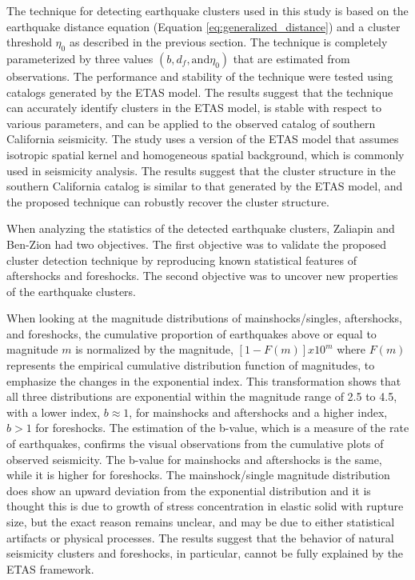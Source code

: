 \documentclass[12pt]{article} %
\theoremstyle{plain}
\begin{document}
	The technique for detecting earthquake clusters used in this study is based on the earthquake distance equation (Equation \ref{eq:generalized_distance}) and a cluster threshold $\eta_0$ as described in the previous section. The technique is completely parameterized by three values $(b, d_f, \text{and} \eta_0)$ that are estimated from observations. The performance and stability of the technique were tested using catalogs generated by the ETAS model. The results suggest that the technique can accurately identify clusters in the ETAS model, is stable with respect to various parameters, and can be applied to the observed catalog of southern California seismicity. The study uses a version of the ETAS model that assumes isotropic spatial kernel and homogeneous spatial background, which is commonly used in seismicity analysis. The results suggest that the cluster structure in the southern California catalog is similar to that generated by the ETAS model, and the proposed technique can robustly recover the cluster structure.
	
	When analyzing the statistics of the detected earthquake clusters, Zaliapin and Ben-Zion had two objectives. The first objective was to validate the proposed cluster detection technique by reproducing known statistical features of aftershocks and foreshocks. The second objective was to uncover new properties of the earthquake clusters.
	
	
	When looking at the magnitude distributions of mainshocks/singles, aftershocks, and foreshocks, the cumulative proportion of earthquakes above or equal to magnitude $m$ is normalized by the magnitude, $[1-F(m)]x10^m$ where $F(m)$ represents the empirical cumulative distribution function of magnitudes, to emphasize the changes in the exponential index. This transformation shows that all three distributions are exponential within the magnitude range of 2.5 to 4.5, with a lower index, $b \approx 1 $, for mainshocks and aftershocks and a higher index, $b>1$ for foreshocks. The estimation of the b-value, which is a measure of the rate of earthquakes, confirms the visual observations from the cumulative plots of observed seismicity. The b-value for mainshocks and aftershocks is the same, while it is higher for foreshocks. The mainshock/single magnitude distribution does show an upward deviation from the exponential distribution and it is thought this is due to growth of stress concentration in elastic solid with rupture size, but the exact reason remains unclear, and may be due to either statistical artifacts or physical processes. The results suggest that the behavior of natural seismicity clusters and foreshocks, in particular, cannot be fully explained by the ETAS framework.
	
\end{document}

